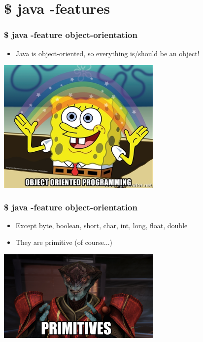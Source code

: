 
\section{\$ java -features}


\begin{frame}
  \frametitle{\$ java -feature object-orientation}

  \begin{itemize}
    \item Java is object-oriented, so everything is/should be an object!
  \end{itemize}
  \vspace{0.4cm}
  \begin{center}
    \includegraphics[width=0.6\textwidth]{fig/objects}
  \end{center}
\end{frame}


\begin{frame}
  \frametitle{\$ java -feature object-orientation}

  \begin{itemize}
    \item Except byte, boolean, short, char, int, long, float, double
    \vspace{0.4cm}
    \item They are primitive (of course...)
  \end{itemize}
  \vspace{0.25cm}
  \begin{center}
    \includegraphics[width=0.6\textwidth]{fig/primitive}
  \end{center}
\end{frame}


